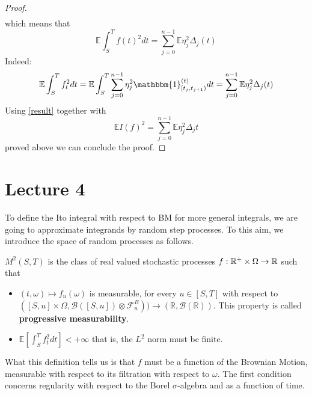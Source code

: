 \begin{ProofBox}
\begin{proof}
\begin{align*}
    \end{align*}
    which means that 
    \begin{equation}
    \label{result}
        \mathbb{E}\int_S^T f(t)^2 dt = \sum_{j=0}^{n-1} \mathbb{E}\eta_j^2\Delta_j(t)
    \end{equation}
    Indeed: 
    \begin{equation*}
        \mE \int_S^T f_t^2 dt= \mE \int_S^T \sum_{j = 0}^{n-1} \eta_j^2 \mathbbm{1}_{[t_j, t_{j+1})}^{(t)} dt= \sum_{j = 0}^{n-1} \mE \eta_j^2 \Delta_j(t)
    \end{equation*}
    Using \ref{result} together with 
    \begin{equation*}
        \mathbb{E}I(f)^2 = \sum_{j=0}^{n-1} \mathbb{E}\eta_j^2 \Delta_j t
    \end{equation*}
    proved above we can conclude the proof.
\end{proof}

\end{ProofBox}
\section{Lecture 4}
To define the Ito integral with respect to BM for more general integrals, we are going to approximate integrands by random step processes. To this aim, we introduce the space of random processes as follows. 
\begin{DefBox}
    \begin{Def}
    $M^2(S,T)$ is the class of real valued stochastic processes 
    $f: \mathbb{R}^+ \times \Omega \to \mathbb{R}$ such that 
    \begin{itemize}
        \item $(t,\omega) \mapsto f_u(\omega)$ is measurable, for every $u \in [S,T]$ with respect to $([S,u] \times \Omega, \mathcal{B}([S,u]) \otimes \mathcal{F}_u^B)) \to (\mathbb{R}, \mathcal{B}(\mathbb{R}))$. This property is called \textbf{progressive measurability}. 
        \item $\mathbb{E}[\int_S^T f_t^2 dt]< +\infty$ that is, the $L^2$ norm must be finite. 
    \end{itemize}
\end{Def}
\end{DefBox}
What this definition tells us is that $f$ must be a function of the Brownian Motion, measurable with respect to its filtration with respect to $\omega$. The first condition concerns regularity with respect to the Borel $\sigma$-algebra and as a function of time. 

